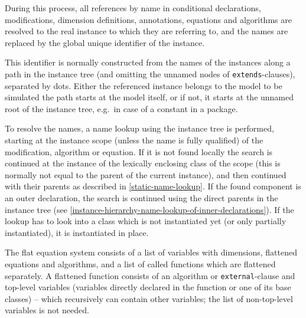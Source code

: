 During this process, all references by name in conditional declarations, modifications, dimension definitions, annotations, equations and algorithms are resolved to the real instance to which they are referring to, and the names are replaced by the global unique identifier of the instance.

\begin{nonnormative}
This identifier is normally constructed from the names of the instances along a path in the instance tree (and omitting the unnamed nodes of \lstinline!extends!-clauses), separated by dots.
Either the referenced instance belongs to the model to be simulated the path starts at the model itself, or if not, it starts at the unnamed root of the instance tree, e.g.\ in case of a constant in a package.
\end{nonnormative}

\begin{nonnormative}
To resolve the names, a name lookup using the instance tree is performed, starting at the instance scope (unless the name is fully qualified) of the modification, algorithm or equation.
If it is not found locally the search is continued at the instance of the lexically enclosing class of the scope (this is normally not equal to the parent of the current instance), and then continued with their parents as described in \cref{static-name-lookup}.
If the found component is an outer declaration, the search is continued using the direct parents in the instance tree (see \cref{instance-hierarchy-name-lookup-of-inner-declarations}).
If the lookup has to look into a class which is not instantiated yet (or only partially instantiated), it is instantiated in place.
\end{nonnormative}

The flat equation system consists of a list of variables with dimensions, flattened equations and algorithms, and a list of called functions which are flattened separately.
A flattened function consists of an algorithm or \lstinline!external!-clause and top-level variables (variables directly declared in the function or one of its base classes) -- which recursively can contain other variables; the list of non-top-level variables is not needed.

